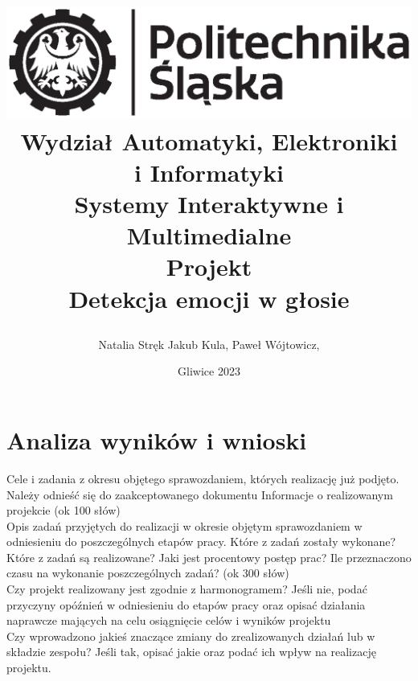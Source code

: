 \documentclass[12pt,titlepage]{article}
\title{
\includegraphics[scale=0.75]{img/politechnika_sl_logo_bw_poziom_pl.eps}\\
\textbf{Wydział Automatyki, Elektroniki\\
i Informatyki}\\
\vspace*{1cm}
Systemy Interaktywne i Multimedialne \\ Projekt \\ Detekcja emocji w głosie

\vspace*{5cm}
}
\author{
Natalia Stręk
Jakub Kula,
Paweł Wójtowicz,
}
\date{Gliwice 2023}
\begin{document}
\maketitle

\tableofcontents

\newpage
\section{Analiza wyników i wnioski}
Cele i zadania z okresu objętego sprawozdaniem, których realizację już podjęto. Należy odnieść się do zaakceptowanego dokumentu Informacje o realizowanym projekcie (ok 100 słów)\\

Opis zadań przyjętych do realizacji w okresie objętym sprawozdaniem w odniesieniu do poszczególnych etapów pracy. Które z zadań zostały wykonane? Które z zadań są realizowane? Jaki jest procentowy postęp prac? Ile przeznaczono czasu na wykonanie poszczególnych zadań? (ok 300 słów)\\

Czy projekt realizowany jest zgodnie z harmonogramem? Jeśli nie, podać przyczyny opóźnień w odniesieniu do etapów pracy oraz opisać działania naprawcze mających na celu osiągnięcie celów i wyników projektu\\

Czy wprowadzono jakieś znaczące zmiany do zrealizowanych działań lub w składzie zespołu? Jeśli tak, opisać jakie oraz podać ich wpływ na realizację projektu.
\end{document}
